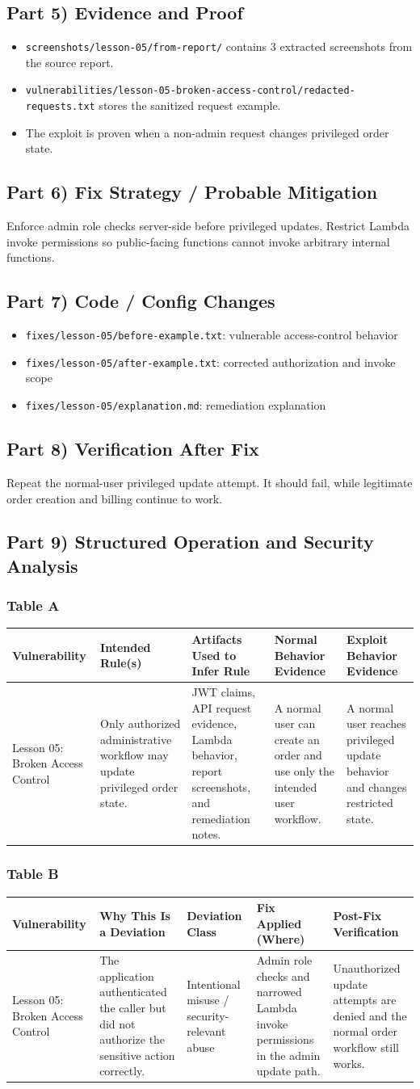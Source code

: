 \documentclass[12pt]{article}
\makeatletter
\newcommand{\analysistables}[9]{
\subsubsection*{Table A}
{\footnotesize
\begin{longtable}{@{}p{0.13\textwidth}p{0.18\textwidth}p{0.17\textwidth}p{0.16\textwidth}p{0.16\textwidth}@{}}
\toprule
Vulnerability & Intended Rule(s) & Artifacts Used to Infer Rule & Normal Behavior Evidence & Exploit Behavior Evidence \\
\midrule
#1 & #2 & #3 & #4 & #5 \\
\bottomrule
\end{longtable}
}

\subsubsection*{Table B}
{\footnotesize
\begin{longtable}{@{}p{0.13\textwidth}p{0.18\textwidth}p{0.13\textwidth}p{0.18\textwidth}p{0.16\textwidth}@{}}
\toprule
Vulnerability & Why This Is a Deviation & Deviation Class & Fix Applied (Where) & Post-Fix Verification \\
\midrule
#1 & #6 & #7 & #8 & #9 \\
\bottomrule
\end{longtable}
}
}
\makeatother
\begin{document}
\subsection*{Part 5) Evidence and Proof}
\begin{itemize}
\item \texttt{screenshots/lesson-05/from-report/} contains 3 extracted screenshots from the source report.
\item \texttt{vulnerabilities/lesson-05-broken-access-control/redacted-requests.txt} stores the sanitized request example.
\item The exploit is proven when a non-admin request changes privileged order state.
\end{itemize}

\subsection*{Part 6) Fix Strategy / Probable Mitigation}
Enforce admin role checks server-side before privileged updates. Restrict Lambda invoke permissions so public-facing functions cannot invoke arbitrary internal functions.

\subsection*{Part 7) Code / Config Changes}
\begin{itemize}
\item \texttt{fixes/lesson-05/before-example.txt}: vulnerable access-control behavior
\item \texttt{fixes/lesson-05/after-example.txt}: corrected authorization and invoke scope
\item \texttt{fixes/lesson-05/explanation.md}: remediation explanation
\end{itemize}

\subsection*{Part 8) Verification After Fix}
Repeat the normal-user privileged update attempt. It should fail, while legitimate order creation and billing continue to work.

\subsection*{Part 9) Structured Operation and Security Analysis}
\analysistables
{Lesson 05: Broken Access Control}
{Only authorized administrative workflow may update privileged order state.}
{JWT claims, API request evidence, Lambda behavior, report screenshots, and remediation notes.}
{A normal user can create an order and use only the intended user workflow.}
{A normal user reaches privileged update behavior and changes restricted state.}
{The application authenticated the caller but did not authorize the sensitive action correctly.}
{Intentional misuse / security-relevant abuse}
{Admin role checks and narrowed Lambda invoke permissions in the admin update path.}
{Unauthorized update attempts are denied and the normal order workflow still works.}
\end{document}
